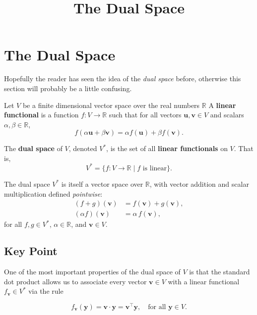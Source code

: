 \documentclass[11pt]{article}
\title{The Dual Space}
\author{}
\date{}
\begin{document}
\maketitle

\Large




\section*{\huge The Dual Space}

Hopefully the reader has seen the idea of the \emph{dual space} before, otherwise this section will probably be a little confusing. 

Let $ V $ be a finite dimensional vector space over the real numbers $ \mathbb{R} $  
A \textbf{linear functional} is a function $ f: V \to \mathbb{R} $ such that for all vectors $ \mathbf{u}, \mathbf{v} \in V $ and scalars $ \alpha, \beta \in \mathbb{R} $,
\[
f(\alpha \mathbf{u} + \beta \mathbf{v}) = \alpha f(\mathbf{u}) + \beta f(\mathbf{v}).
\]



The \textbf{dual space} of $ V $, denoted $ V^* $, is the set of all \textbf{linear functionals} on $ V $. That is,
\[
V^* = \{ f: V \to \mathbb{R} \mid f \text{ is linear} \}.
\]



The dual space $ V^* $ is itself a vector space over $ \mathbb{R} $, with vector addition and scalar multiplication defined \textit{pointwise}:
\begin{align*}
(f + g)(\mathbf{v}) &= f(\mathbf{v}) + g(\mathbf{v}), \\
(\alpha f)(\mathbf{v}) &= \alpha \, f(\mathbf{v}),
\end{align*}
for all $ f, g \in V^* $, $ \alpha \in \mathbb{R} $, and $ \mathbf{v} \in V $.



\subsection*{\Large Key Point}

One of the most important properties of the dual space of $V$ is that the standard dot product allows us to associate every vector $\mathbf{v} \in V$ with a linear functional $f_{\mathbf{v}} \in V^*$ via the rule

\vspace{1em}
\[
\boxed{f_{\mathbf{v}}(\mathbf{y}) = \mathbf{v} \cdot \mathbf{y} = \mathbf{v}^\top \mathbf{y}, 
\quad \text{for all } \mathbf{y} \in V}.
\]
\vspace{1em}
\end{document}
